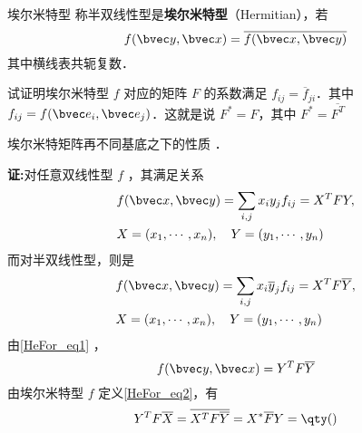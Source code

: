 
\begin{definition}{埃尔米特型}
称半双线性型是\textbf{埃尔米特型}（Hermitian），若
\begin{equation}\label{HeFor_eq2}
f(\bvec y,\bvec x)=\overline{f(\bvec x,\bvec y)}
\end{equation}
其中横线表共轭复数．
\end{definition}
\begin{example}{}
试证明埃尔米特型 $f$ 对应的矩阵 $F$ 的系数满足 $f_{ij}=\overline f_{ji}$．其中 $f_{ij}=f(\bvec e_i,\bvec e_j)$．这就是说 $F^*=F$，其中 $F^*=\overline {F^T}$
\end{example}
\begin{example}{埃尔米特矩阵再不同基底之下的性质}
．

\textbf{证:}对任意双线性型 $f$ ，其满足关系
\begin{equation}
\begin{aligned}
&f(\bvec x,\bvec y)=\sum_{i,j}x_i y_j f_{ij}=X^TFY,\\
&X=(x_1,\cdots,x_n),\quad Y=(y_1,\cdots,y_n)
\end{aligned}
\end{equation}
而对半双线性型，则是
\begin{equation}\label{HeFor_eq1}
\begin{aligned}
&f(\bvec x,\bvec y)=\sum_{i,j}x_i \overline y_j f_{ij}=X^TF\overline Y,\\
&X=(x_1,\cdots,x_n),\quad Y=(y_1,\cdots,y_n)
\end{aligned}
\end{equation}
由\autoref{HeFor_eq1} ，
\begin{equation}
f(\bvec y,\bvec x)=Y^TF\overline Y
\end{equation}
由埃尔米特型 $f$ 定义\autoref{HeFor_eq2}，有
\begin{equation}
Y^TF\overline X=\overline{X^TF\overline Y}=X^*\overline FY=\qty()
\end{equation}
 
\end{example}